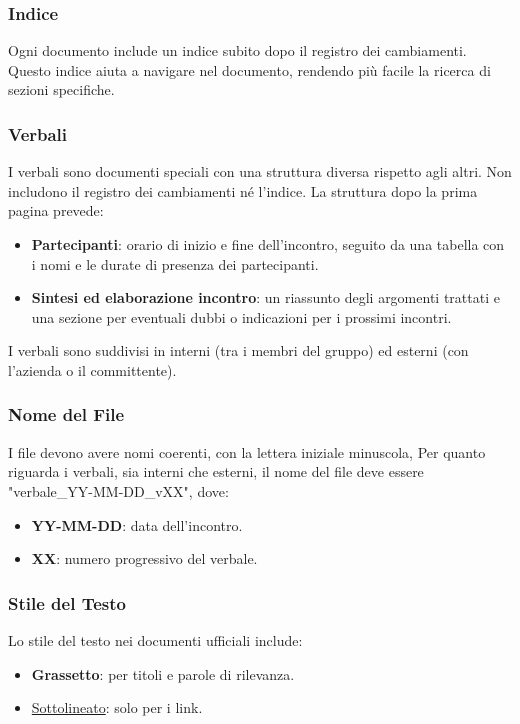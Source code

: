 \subsubsection*{Indice}
Ogni documento include un indice subito dopo il registro dei cambiamenti. 
Questo indice aiuta a navigare nel documento, rendendo più facile la ricerca di sezioni specifiche.

\subsubsection{Verbali}
I verbali sono documenti speciali con una struttura diversa rispetto agli altri. Non includono il registro dei cambiamenti né l'indice.
La struttura dopo la prima pagina prevede:
\begin{itemize}
    \item \textbf{Partecipanti}: orario di inizio e fine dell'incontro, seguito da una tabella con i nomi e le durate di presenza dei partecipanti.
    \item \textbf{Sintesi ed elaborazione incontro}: un riassunto degli argomenti trattati e una sezione per eventuali dubbi o indicazioni per i prossimi incontri.
\end{itemize}
I verbali sono suddivisi in interni (tra i membri del gruppo) ed esterni (con l'azienda o il committente).


\subsubsection{Nome del File}
I file devono avere nomi coerenti, con la lettera iniziale minuscola, 
Per quanto riguarda i verbali, sia interni che esterni, il nome del file deve essere "verbale\_YY-MM-DD\_vXX", dove:
\begin{itemize}
    \item \textbf{YY-MM-DD}: data dell'incontro.
    \item \textbf{XX}: numero progressivo del verbale.
\end{itemize}

\subsubsection{Stile del Testo}
Lo stile del testo nei documenti ufficiali include:
\begin{itemize}
    \item \textbf{Grassetto}: per titoli e parole di rilevanza.
    \item \underline{Sottolineato}: solo per i link.
\end{itemize}

